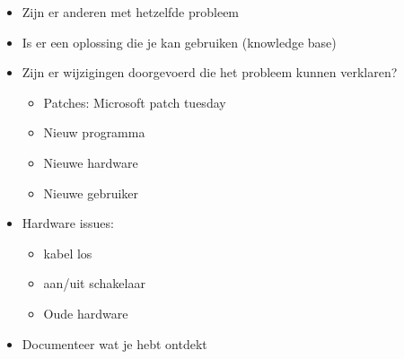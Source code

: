\begin{itemize}
\item Zijn er anderen met hetzelfde probleem
\item Is er een oplossing die je kan gebruiken (knowledge base)
\item Zijn er wijzigingen doorgevoerd die het probleem kunnen verklaren?
	\begin{itemize}
	\item Patches: Microsoft patch tuesday
	\item Nieuw programma
	\item Nieuwe hardware
	\item Nieuwe gebruiker
	\end{itemize}
\item Hardware issues:
	\begin{itemize}
		\item kabel los
		\item aan/uit schakelaar
		\item Oude hardware
	\end{itemize}
\item Documenteer wat je hebt ontdekt
\end{itemize}
